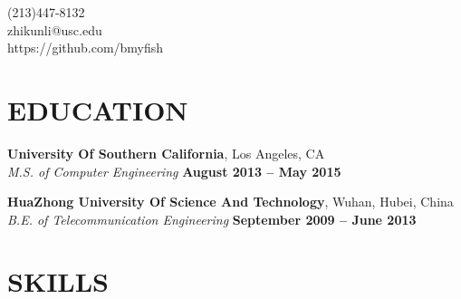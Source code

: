 \documentclass[margin,line]{resume}
\begin{document}
{
	\sc
    \hfill (213)447-8132                  		  \vspace{0mm}\\\vspace{0mm}%
    \hfill zhikunli@usc.edu            		      \vspace{0mm}\\\vspace{0mm}%
    \hfill https://github.com/bmyfish             \vspace{0mm}\\\vspace{-10mm}%
}

\begin{resume}

\vspace{1mm}

    \section{\mysidestyle \textbf{\large{E}\small{DUCATION}}}
    \textbf{\listing University Of Southern California}, Los Angeles, CA \vspace{2mm}\\\vspace{1mm}%
    \textsl{M.S. of Computer Engineering} \hfill \textbf{August 2013 -- May 2015}\vspace{-3mm}\\\vspace{-1mm}%

    \textbf{\listing HuaZhong University Of Science And Technology}, Wuhan, Hubei, China \vspace{2mm}\\\vspace{1mm}%
    \textsl{B.E. of Telecommunication Engineering} \hfill \textbf{September 2009 -- June 2013}\vspace{-3mm}\\\vspace{-1mm}%

\sectionline

    \section{\mysidestyle \textbf{\large{S}\small{KILLS}}}


\end{resume}
\end{document}
